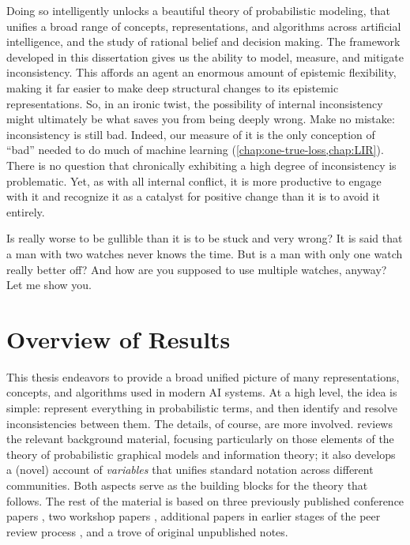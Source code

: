Doing so intelligently unlocks a beautiful theory of probabilistic modeling, that unifies a broad range of concepts, representations, and algorithms across artificial intelligence, and 
    the study of rational belief and decision making.
The framework developed in this dissertation
gives us the ability to model, measure, and mitigate inconsistency.
This affords an agent an enormous amount of epistemic flexibility,
    making it far easier to make deep structural changes to its epistemic
    representations.
So, in an ironic twist, the possibility of internal inconsistency might ultimately be what saves you from being deeply wrong. 
%
Make no mistake: inconsistency is still bad.
Indeed, our measure of it is the only conception of ``bad'' needed to do much of machine learning (\cref{chap:one-true-loss,chap:LIR}).
There is no question that chronically exhibiting a high degree of inconsistency is problematic.
%
Yet, as with all internal conflict, it is more productive to engage with it and recognize it as a catalyst for positive change
than it is to avoid it entirely. 

%
Is really worse to be gullible than it is to be stuck and very wrong? 
It is said that a man with two watches never knows the time.  
But is a man with only one watch really better off?
And how are you supposed to use multiple watches, anyway?
Let me show you. 

\section{Overview of Results}
    \label{sec:overview-of-results}

This thesis endeavors to provide a broad unified picture of many representations, concepts, and algorithms used in modern AI systems.
At a high level, the idea is simple: represent everything in probabilistic terms, and then identify and resolve inconsistencies between them.
The details, of course, are more involved.
 reviews the relevant background material, focusing particularly on those elements of the theory of probabilistic graphical models and information theory;
it also develops a (novel) account of \emph{variables} that unifies standard notation across different communities. 
Both aspects serve as the building blocks for the theory that follows.
%
The rest of the material is based on three previously published conference papers
    \citep*{pdg-aaai,one-true-loss,pdg-infer},
two workshop papers
    \citep{LIR,mixture-langs},
additional papers in earlier stages of the peer review process
    \citep*{qim},
and a trove of original unpublished notes. 


